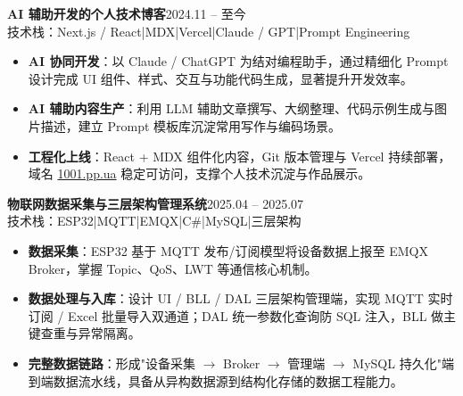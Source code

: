 \documentclass[10pt,a4paper]{article}
\newcommand{\projectblock}[3]{%
    {\bfseries\color{darktext}#1}\hfill{\color{graytext}#2}\\%
    {\small\color{graytext}#3}%
    \vspace{0.2em}%
}
\begin{document}
\vspace{0.15em}

\projectblock{AI 辅助开发的个人技术博客}{2024.11 -- 至今}{技术栈：Next.js / React\hspace{0.3em}|\hspace{0.3em}MDX\hspace{0.3em}|\hspace{0.3em}Vercel\hspace{0.3em}|\hspace{0.3em}Claude / GPT\hspace{0.3em}|\hspace{0.3em}Prompt Engineering}

\begin{itemize}[leftmargin=1.5em, itemsep=2pt, parsep=0pt, topsep=2pt]
    \item \textbf{AI 协同开发}：以 Claude / ChatGPT 为结对编程助手，通过精细化 Prompt 设计完成 UI 组件、样式、交互与功能代码生成，显著提升开发效率。
    \item \textbf{AI 辅助内容生产}：利用 LLM 辅助文章撰写、大纲整理、代码示例生成与图片描述，建立 Prompt 模板库沉淀常用写作与编码场景。
    \item \textbf{工程化上线}：React + MDX 组件化内容，Git 版本管理与 Vercel 持续部署，域名 \href{https://1001.pp.ua}{1001.pp.ua} 稳定可访问，支撑个人技术沉淀与作品展示。
\end{itemize}

\vspace{0.15em}

\projectblock{物联网数据采集与三层架构管理系统}{2025.04 -- 2025.07}{技术栈：ESP32\hspace{0.3em}|\hspace{0.3em}MQTT\hspace{0.3em}|\hspace{0.3em}EMQX\hspace{0.3em}|\hspace{0.3em}C\#\hspace{0.3em}|\hspace{0.3em}MySQL\hspace{0.3em}|\hspace{0.3em}三层架构}

\begin{itemize}[leftmargin=1.5em, itemsep=2pt, parsep=0pt, topsep=2pt]
    \item \textbf{数据采集}：ESP32 基于 MQTT 发布/订阅模型将设备数据上报至 EMQX Broker，掌握 Topic、QoS、LWT 等通信核心机制。
    \item \textbf{数据处理与入库}：设计 UI / BLL / DAL 三层架构管理端，实现 MQTT 实时订阅 / Excel 批量导入双通道；DAL 统一参数化查询防 SQL 注入，BLL 做主键查重与异常隔离。
    \item \textbf{完整数据链路}：形成"设备采集 $\to$ Broker $\to$ 管理端 $\to$ MySQL 持久化"端到端数据流水线，具备从异构数据源到结构化存储的数据工程能力。
\end{itemize}
\end{document}

